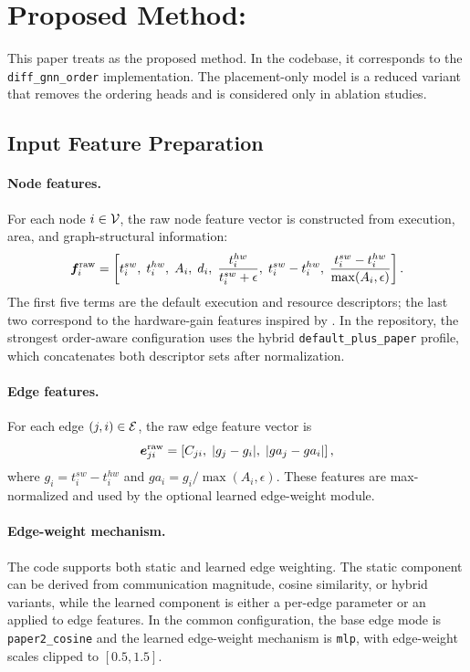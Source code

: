 \section{Proposed Method: \diffgnnorder}
\label{sec:method}
This paper treats \diffgnnorder as the proposed method. In the codebase, it corresponds to the \texttt{diff\_gnn\_order} implementation. The placement-only \diffgnn model is a reduced variant that removes the ordering heads and is considered only in ablation studies.

\subsection{Input Feature Preparation}
\paragraph{Node features.}
For each node $i \in \mathcal{V}$, the raw node feature vector is constructed from execution, area, and graph-structural information:
\begin{equation}
\bm{f}_i^{\mathrm{raw}}=
\left[
t_i^{sw},\;
t_i^{hw},\;
A_i,\;
d_i,\;
\frac{t_i^{hw}}{t_i^{sw}+\epsilon},\;
t_i^{sw}-t_i^{hw},\;
\frac{t_i^{sw}-t_i^{hw}}{\max(A_i,\epsilon)}
\right].
\end{equation}
The first five terms are the default execution and resource descriptors; the last two correspond to the hardware-gain features inspired by \gcps \cite{zheng2021hardware}. In the repository, the strongest order-aware configuration uses the hybrid \texttt{default\_plus\_paper} profile, which concatenates both descriptor sets after normalization.

\paragraph{Edge features.}
For each edge $(j,i)\in\mathcal{E}$, the raw edge feature vector is
\begin{equation}
\bm{e}_{ji}^{\mathrm{raw}}=
\left[
C_{ji},\;
|g_j-g_i|,\;
|ga_j-ga_i|
\right],
\end{equation}
where $g_i=t_i^{sw}-t_i^{hw}$ and $ga_i=g_i/\max(A_i,\epsilon)$. These features are max-normalized and used by the optional learned edge-weight module.

\paragraph{Edge-weight mechanism.}
The code supports both static and learned edge weighting. The static component can be derived from communication magnitude, cosine similarity, or hybrid variants, while the learned component is either a per-edge parameter or an \mlp applied to edge features. In the common \diffgnnorder configuration, the base edge mode is \texttt{paper2\_cosine} and the learned edge-weight mechanism is \texttt{mlp}, with edge-weight scales clipped to $[0.5,1.5]$.

